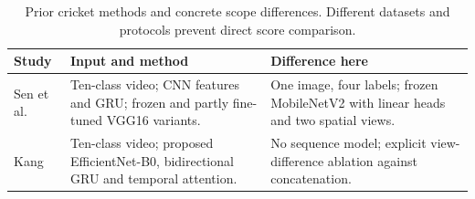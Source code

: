 \begin{table}[t]
\centering\small
\begin{tabular}{@{}>{\raggedright\arraybackslash}p{.14\linewidth}>{\raggedright\arraybackslash}p{.38\linewidth}>{\raggedright\arraybackslash}p{.36\linewidth}@{}}
\toprule
Study & Input and method & Difference here \\
\midrule
Sen et al.~\cite{sen} & Ten-class video; CNN features and GRU; frozen and partly fine-tuned VGG16 variants. & One image, four labels; frozen MobileNetV2 with linear heads and two spatial views. \\
Kang~\cite{kang} & Ten-class video; proposed EfficientNet-B0, bidirectional GRU and temporal attention. & No sequence model; explicit view-difference ablation against concatenation. \\
\bottomrule
\end{tabular}
\caption{Prior cricket methods and concrete scope differences. Different datasets and protocols prevent direct score comparison.}
\label{tab:prior}
\end{table}
